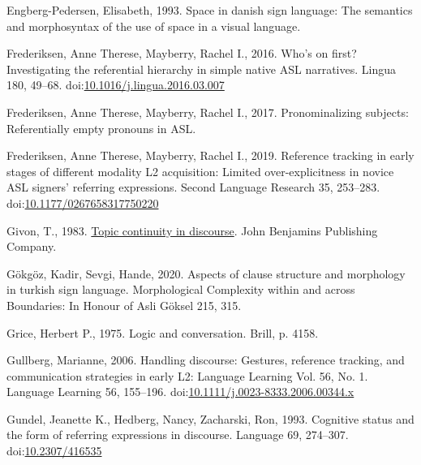 \documentclass[]{elsarticle} %
\newlength{\cslhangindent}
\newenvironment{CSLReferences}[2] %
 {%
  \setlength{\parindent}{0pt}
  \ifodd #1 \everypar{\setlength{\hangindent}{\cslhangindent}}\ignorespaces\fi
  \ifnum #2 > 0
  \setlength{\parskip}{#2\baselineskip}
  \fi
 }%
 {}
\begin{document}
\begin{CSLReferences}{1}{0}
\leavevmode{}%
Engberg-Pedersen, Elisabeth, 1993. Space in danish sign language: The
semantics and morphosyntax of the use of space in a visual language.

\leavevmode{}%
Frederiksen, Anne Therese, Mayberry, Rachel I., 2016. Who's on first?
Investigating the referential hierarchy in simple native ASL narratives.
Lingua 180, 49--68.
doi:\href{https://doi.org/10.1016/j.lingua.2016.03.007}{10.1016/j.lingua.2016.03.007}

\leavevmode{}%
Frederiksen, Anne Therese, Mayberry, Rachel I., 2017. Pronominalizing
subjects: Referentially empty pronouns in ASL.

\leavevmode{}%
Frederiksen, Anne Therese, Mayberry, Rachel I., 2019. Reference tracking
in early stages of different modality L2 acquisition: Limited
over-explicitness in novice ASL signers{'} referring expressions. Second
Language Research 35, 253--283.
doi:\href{https://doi.org/10.1177/0267658317750220}{10.1177/0267658317750220}

\leavevmode{}%
Givon, T., 1983. \href{https://benjamins.com/catalog/tsl.3}{Topic
continuity in discourse}. John Benjamins Publishing Company.

\leavevmode{}%
Gökgöz, Kadir, Sevgi, Hande, 2020. Aspects of clause structure and
morphology in turkish sign language. Morphological Complexity within and
across Boundaries: In Honour of Asli Göksel 215, 315.

\leavevmode{}%
Grice, Herbert P., 1975. Logic and conversation. Brill, p. 4158.

\leavevmode{}%
Gullberg, Marianne, 2006. Handling discourse: Gestures, reference
tracking, and communication strategies in early L2: Language Learning
Vol. 56, No. 1. Language Learning 56, 155--196.
doi:\href{https://doi.org/10.1111/j.0023-8333.2006.00344.x}{10.1111/j.0023-8333.2006.00344.x}

\leavevmode{}%
Gundel, Jeanette K., Hedberg, Nancy, Zacharski, Ron, 1993. Cognitive
status and the form of referring expressions in discourse. Language 69,
274--307. doi:\href{https://doi.org/10.2307/416535}{10.2307/416535}


\end{CSLReferences}
\end{document}
